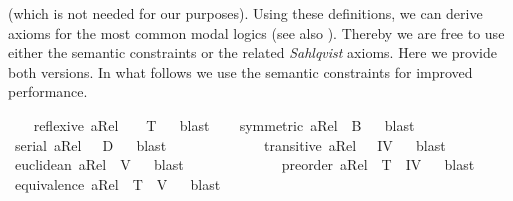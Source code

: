 \begin{isabellebody}
\begin{isamarkuptext}
{{  (which is not needed for our purposes).
  Using these definitions, we can derive axioms for the most common modal logics (see also \cite{C47}). 
  Thereby we are free to use either the semantic constraints or the related \emph{Sahlqvist} axioms. Here we provide 
  both versions. In what follows we use the semantic constraints for improved performance.}
}%
\end{isamarkuptext}\isamarkuptrue%
\ \ \isamarkupfalse%
\ {\isachardoublequoteopen}reflexive\ aRel\ \ {\isasymLongrightarrow}\ \ {\isasymlfloor}T{\isasymrfloor}{\isachardoublequoteclose}%
\ %
%
\isamarkupfalse%
\ blast%
%
%
\isanewline
\ \ \isamarkupfalse%
\ {\isachardoublequoteopen}symmetric\ aRel\ {\isasymLongrightarrow}\ {\isasymlfloor}B{\isasymrfloor}{\isachardoublequoteclose}%
\ %
%
\isamarkupfalse%
\ blast%
%
%
\isanewline
\ \ \isamarkupfalse%
\ {\isachardoublequoteopen}serial\ aRel\ \ {\isasymLongrightarrow}\ {\isasymlfloor}D{\isasymrfloor}{\isachardoublequoteclose}%
\ %
%
\isamarkupfalse%
\ blast%
%
%
\ \ \ \ \ \ \ \ \ \isanewline
\ \ \isamarkupfalse%
\ {\isachardoublequoteopen}transitive\ aRel\ \ {\isasymLongrightarrow}\ {\isasymlfloor}IV{\isasymrfloor}{\isachardoublequoteclose}%
\ %
%
\isamarkupfalse%
\ blast%
%
%
\ \ \ \isanewline
\ \ \isamarkupfalse%
\ {\isachardoublequoteopen}euclidean\ aRel\ {\isasymLongrightarrow}\ {\isasymlfloor}V{\isasymrfloor}{\isachardoublequoteclose}%
\ %
%
\isamarkupfalse%
\ blast%
%
%
\ \ \ \ \ \ \ \ \ \isanewline
\ \ \isamarkupfalse%
\ {\isachardoublequoteopen}preorder\ aRel\ {\isasymLongrightarrow}\ {\isasymlfloor}T{\isasymrfloor}\ {\isasymand}\ {\isasymlfloor}IV{\isasymrfloor}{\isachardoublequoteclose}%
\ %
%
\isamarkupfalse%
\ blast\ %
%
%
%
\isanewline
\ \ \isamarkupfalse%
\ {\isachardoublequoteopen}equivalence\ aRel\ {\isasymLongrightarrow}\ {\isasymlfloor}T{\isasymrfloor}\ {\isasymand}\ {\isasymlfloor}V{\isasymrfloor}{\isachardoublequoteclose}%
\ %
%
\isamarkupfalse%
\ blast\ %
%
%
%
%
%
%
%
%
%
%
%
%
%
%
%
%
%
%
%
%
%
%
%
%
%
%
%
%
%
%
%
%
%
%
%
%
%
%
%
%
%
%
%
%
%
%
%
%
%
%
%
%
%
%
%
%
%
%
%
%
%
%
%
%
%
%
%
%
%
%
%
%
%
%
%
%
%
%
%
%
%
%
\end{isabellebody}%
